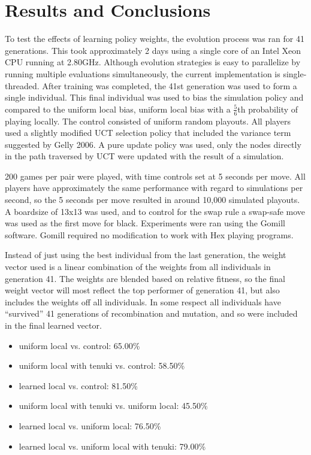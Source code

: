 \documentclass[11pt]{report}
\begin{document}
\section{Results and Conclusions}\label{results}
To test the effects of learning policy weights, the evolution process was ran for 41 generations. This took approximately 2 days using a single core of an Intel Xeon CPU running at 2.80GHz. Although evolution strategies is easy to parallelize by running multiple evaluations simultaneously, the current implementation is single-threaded. After training was completed, the 41st generation was used to form a single individual. This final individual was used to bias the simulation policy and compared to the uniform local bias, uniform local bias with a $\frac{5}{6}$th probability of playing locally. The control consisted of uniform random playouts. All players used a slightly modified UCT selection policy that included the variance term suggested by Gelly 2006\cite{gelly2006exploration}. A pure update policy was used, only the nodes directly in the path traversed by UCT were updated with the result of a simulation.

200 games per pair were played, with time controls set at 5 seconds per move. All players have approximately the same performance with regard to simulations per second, so the 5 seconds per move resulted in around 10,000 simulated playouts. A boardsize of 13x13 was used, and to control for the swap rule a swap-safe move was used as the first move for black. Experiments were ran using the Gomill software\cite{gomill}. Gomill required no modification to work with Hex playing programs.

Instead of just using the best individual from the last generation, the weight vector used is a linear combination of the weights from all individuals in generation 41. The weights are blended based on relative fitness, so the final weight vector will most reflect the top performer of generation 41, but also includes the weights off all individuals. In some respect all individuals have ``survived'' 41 generations of recombination and mutation, and so were included in the final learned vector.

\begin{itemize}
\item uniform local vs. control: 65.00\%
\item uniform local with tenuki vs. control: 58.50\%
\item learned local vs. control: 81.50\%
\item uniform local with tenuki vs. uniform local: 45.50\%
\item learned local vs. uniform local: 76.50\%
\item learned local vs. uniform local with tenuki: 79.00\%
\end{itemize}
\end{document}
